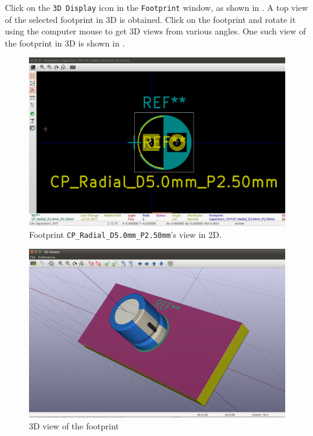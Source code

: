 \item Click on the \texttt{3D Display} icon in the {\tt Footprint}
window, as shown in . A top view of the selected footprint
in 3D is obtained. Click on the footprint and rotate it using the computer mouse to
get 3D views from various angles. One such view of the footprint
in 3D is shown in .

\begin{figure}
\centering
\includegraphics[width=\lgfig]{manual_images/2dviewofcp.png}
\caption{Footprint \texttt{CP\_Radial\_D5.0mm\_P2.50mm}'s view in 2D.}
\label{2dview}
\end{figure}
\begin{figure}
\centering
\includegraphics[width=\lgfig]{manual_images/3dv.png}
\caption{3D view of the footprint}
\label{3dv}
\end{figure}


